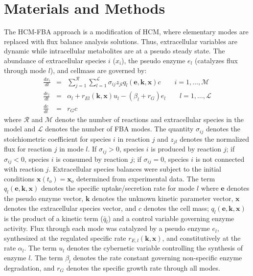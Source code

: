 \documentclass[10pt,twocolumn,twoside,final]{IEEEtran}
\begin{document}
\section{Materials and Methods}
The HCM-FBA approach is a modification of HCM, where elementary modes are replaced with flux balance analysis solutions.
Thus, extracellular variables are dynamic while intracellular metabolites are at a pseudo steady state.
The abundance of extracellular species $i$ ($x_{i}$), the pseudo enzyme $e_{l}$ (catalyzes flux through mode $l$), and cellmass are governed by:
\begin{eqnarray}\nonumber
	\frac{dx_{i}}{dt}  & = &  \sum_{j = 1}^{\mathcal{R}}\sum_{l = 1}^{\mathcal{L}}\sigma_{ij}z_{jl}q_{l}\left(\mathbf{e},\mathbf{k},\mathbf{x}\right)c \qquad{i=1,\hdots,\mathcal{M}}\\\nonumber
  \frac{de_{l}}{dt}  & = & \alpha_{l} + r_{El}\left(\mathbf{k},\mathbf{x}\right)u_{l} - \left(\beta_{l}+r_{G}\right)e_{l} \qquad l=1,\hdots,\mathcal{L} \\\nonumber
  \frac{dc}{dt} & = & r_{G}c
\end{eqnarray}
where $\mathcal{R}$ and $\mathcal{M}$ denote the number of reactions and extracellular species in the model and $\mathcal{L}$ denotes the number of FBA modes.
The quantity $\sigma_{ij}$ denotes the stoichiometric coefficient for species $i$ in reaction $j$ and $z_{jl}$ denotes the normalized flux for reaction $j$ in mode $l$.
If $\sigma_{ij}>0$, species $i$ is produced by reaction $j$;
if $\sigma_{ij}<0$, species $i$ is consumed by reaction $j$; if $\sigma_{ij} = 0$, species $i$ is not connected with reaction $j$.
Extracellular species balances were subject to the initial conditions $\mathbf{x}\left(t_{o}\right) = \mathbf{x}_{o}$ determined from experimental data.
The term $q_{l}\left(\mathbf{e},\mathbf{k},\mathbf{x}\right)$ denotes the specific uptake/secretion rate for mode $l$
where $\mathbf{e}$ denotes the pseudo enzyme vector, $\mathbf{k}$ denotes the unknown kinetic parameter vector, $\mathbf{x}$ denotes the extracellular species vector, and $c$ denotes the cell mass;
$q_{l}\left(\mathbf{e},\mathbf{k},\mathbf{x}\right)$ is the product of a kinetic term ($\bar{q}_{l}$) and a control variable governing enzyme activity.
Flux through each mode was catalyzed by a pseudo enzyme $e_{l}$, synthesized at the regulated specific rate $r_{E,l}\left(\mathbf{k},\mathbf{x}\right)$, and constitutively at the rate $\alpha_{l}$.
The term $u_{l}$ denotes the cybernetic variable controlling the synthesis of enzyme $l$.
The term $\beta_{l}$ denotes the rate constant governing non-specific enzyme degradation, and $r_{G}$ denotes the specific growth rate through all modes.
\end{document}
